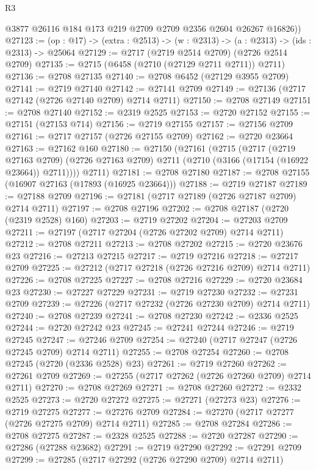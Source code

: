 \begin{lexlean}{R3}
\begin{coremodule}
      @3877 @26116 @184 @173 @219 @2709 @2709 @2356 @2604 @26267 @16826))
@27123 := (op : @17) -> (extra : @2513) -> (w : @2313) -> (a : @2313) -> (ids : @2313) -> @25064
@27129 := @2717 (@2719 @2514 @2709) (@2726 @2514 @2709)
@27135 := @2715 (@6458 (@2710 (@27129 @2711 @2711)) @2711)
@27136 := @2708 @27135
@27140 := @2708 @6452 (@27129 @3955 @2709)
@27141 := @2719 @27140
@27142 := @27141 @2709
@27149 := @27136 (@2717 @27142 (@2726 @27140 @2709) @2714 @2711)
@27150 := @2708 @27149
@27151 := @2708 @27140
@27152 := @2319 @2525
@27153 := @2720 @27152
@27155 := @27151 (@27153 @714)
@27156 := @2719 @27155
@27157 := @27156 @2709
@27161 := @2717 @27157 (@2726 @27155 @2709)
@27162 := @2720 @23664
@27163 := @27162 @160
@27180 := @27150
    (@27161
      (@2715
        (@2717
          (@2719 @27163 @2709)
          (@2726 @27163 @2709)
          @2711
          (@2710 (@3166 (@17154 (@16922 @23664)) @2711))))
      @2711)
@27181 := @2708 @27180
@27187 := @2708 @27155 (@16907 @27163 (@17893 (@16925 @23664)))
@27188 := @2719 @27187
@27189 := @27188 @2709
@27196 := @27181 (@2717 @27189 (@2726 @27187 @2709) @2714 @2711)
@27197 := @2708 @27196
@27202 := @2708 @27187 (@2720 (@2319 @2528) @160)
@27203 := @2719 @27202
@27204 := @27203 @2709
@27211 := @27197 (@2717 @27204 (@2726 @27202 @2709) @2714 @2711)
@27212 := @2708 @27211
@27213 := @2708 @27202
@27215 := @2720 @23676 @23
@27216 := @27213 @27215
@27217 := @2719 @27216
@27218 := @27217 @2709
@27225 := @27212 (@2717 @27218 (@2726 @27216 @2709) @2714 @2711)
@27226 := @2708 @27225
@27227 := @2708 @27216
@27229 := @2720 @23684 @23
@27230 := @27227 @27229
@27231 := @2719 @27230
@27232 := @27231 @2709
@27239 := @27226 (@2717 @27232 (@2726 @27230 @2709) @2714 @2711)
@27240 := @2708 @27239
@27241 := @2708 @27230
@27242 := @2336 @2525
@27244 := @2720 @27242 @23
@27245 := @27241 @27244
@27246 := @2719 @27245
@27247 := @27246 @2709
@27254 := @27240 (@2717 @27247 (@2726 @27245 @2709) @2714 @2711)
@27255 := @2708 @27254
@27260 := @2708 @27245 (@2720 (@2336 @2528) @23)
@27261 := @2719 @27260
@27262 := @27261 @2709
@27269 := @27255 (@2717 @27262 (@2726 @27260 @2709) @2714 @2711)
@27270 := @2708 @27269
@27271 := @2708 @27260
@27272 := @2332 @2525
@27273 := @2720 @27272
@27275 := @27271 (@27273 @23)
@27276 := @2719 @27275
@27277 := @27276 @2709
@27284 := @27270 (@2717 @27277 (@2726 @27275 @2709) @2714 @2711)
@27285 := @2708 @27284
@27286 := @2708 @27275
@27287 := @2328 @2525
@27288 := @2720 @27287
@27290 := @27286 (@27288 @23682)
@27291 := @2719 @27290
@27292 := @27291 @2709
@27299 := @27285 (@2717 @27292 (@2726 @27290 @2709) @2714 @2711)

\end{coremodule}
\end{lexlean}
